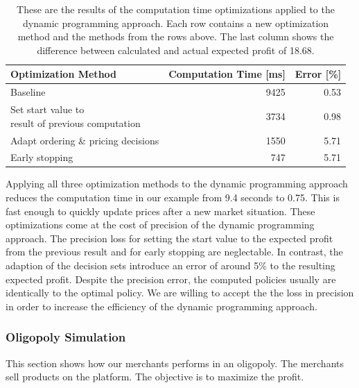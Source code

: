 \begin{table}[t]
	\centering
	\begin{tabular}{ lrr }
		\toprule
		Optimization Method & Computation Time [ms] & Error [\%] \\
		\midrule
		Baseline & 9425 & 0.53 \\
		\makecell[l]{Set start value to \\ result of previous computation} & 3734 & 0.98 \\
		Adapt ordering \& pricing decisions & 1550 & 5.71 \\
		Early stopping & 747 & 5.71\\
		\bottomrule
	\end{tabular}
	\caption{These are the results of the computation time optimizations applied to the dynamic programming approach.
	Each row contains a new optimization method and the methods from the rows above. The last column shows the difference between calculated and actual expected profit of 18.68.}
	\label{tab:speedup}
\end{table}

Applying all three optimization methods to the dynamic programming approach reduces the computation time in our example from 9.4 seconds to 0.75.
This is fast enough to quickly update prices after a new market situation.
These optimizations come at the cost of precision of the dynamic programming approach.
The precision loss for setting the start value to the expected profit from the previous result and for early stopping are neglectable.
In contrast, the adaption of the decision sets introduce an error of around 5\% to the resulting expected profit.
Despite the precision error, the computed policies usually are identically to the optimal policy.
We are willing to accept the the loss in precision in order to increase the efficiency of the dynamic programming approach.

\subsubsection{Oligopoly Simulation}
This section shows how our merchants performs in an oligopoly.
The merchants sell products on the \pricewars platform.
The objective is to maximize the profit.

